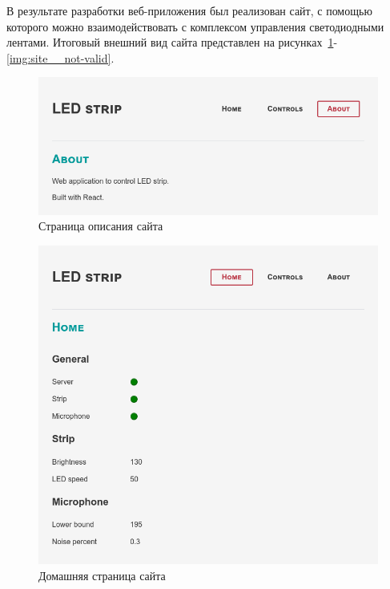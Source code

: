 В результате разработки веб-приложения был реализован сайт, с помощью которого можно взаимодействовать с комплексом управления светодиодными лентами. Итоговый внешний вид сайта представлен на рисунках~\ref{img:site__about}-\ref{img:site__not-valid}.

\begin{figure}[H]
  \centering
  \includegraphics[height=0.2\textheight]{assets/images/practical/site__about.png}
  \caption{Страница описания сайта}
  \label{img:site__about}
\end{figure}

\begin{figure}[H]
  \centering
  \includegraphics[height=0.4\textheight]{assets/images/practical/site__home.png}
  \caption{Домашняя страница сайта}
  \label{img:site__home}
\end{figure}

